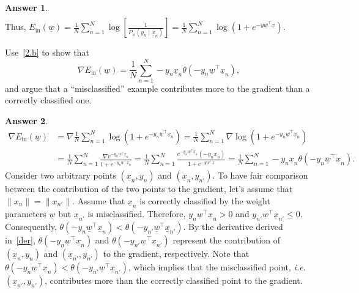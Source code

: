 \documentclass{article}
\theoremstyle{definition}
\newtheorem*{answer}{Answer}
\begin{document}
\begin{question}
\begin{question}
\begin{answer}
\begin{align*}
			\end{align*}
			Thus, $E_{\text{in}}(\underline{w}) = \frac{1}{N} \sum_{n=1}^N \log\left[\frac{1}{P_{\underline{w}}(y_n \mid \underline{x}_n)}\right] = \frac{1}{N} \sum_{n=1}^N \log (1 + e^{-y \underline{w}^\top \underline{x}})$.
		\end{answer}
		\item Use~\ref{2.b} to show that
		\begin{equation*}
			\nabla E_{\text{in}}(\underline{w}) = \frac{1}{N} \sum_{n=1}^N -y_n \underline{x}_n \theta(-y_n \underline{w}^\top \underline{x}_n),
		\end{equation*}
		and argue that a ``misclassified'' example contributes more to the gradient than a correctly classified one.
		\begin{answer}
			\begin{align}
				\nabla E_{\text{in}}(\underline{w}) &= \nabla \frac{1}{N} \sum_{n=1}^N \log (1 + e^{-y_n \underline{w}^\top \underline{x}_n}) = \frac{1}{N} \sum_{n=1}^N \nabla \log (1 + e^{-y_n \underline{w}^\top \underline{x}_n})\nonumber \\ 
				&= \frac{1}{N} \sum_{n=1}^N \frac{\nabla e^{-y_n \underline{w}^\top \underline{x}_n}}{1 + e^{-y_n \underline{w}^\top \underline{x}_n}} = \frac{1}{N} \sum_{n=1}^N \frac{e^{-y_n \underline{w}^\top \underline{x}_n} (-y_n \underline{x}_n)}{1 + e^{-y \underline{w}^\top \underline{x}}} = \frac{1}{N} \sum_{n=1}^N -y_n \underline{x}_n \theta(-y_n \underline{w}^\top \underline{x}_n).\label{der}
			\end{align}
			Consider two arbitrary points $(\underline{x}_n, y_n)$ and $(\underline{x}_{n}, y_{n'})$. To have fair comparison between the contribution of the two points to the gradient, let's assume that $\|x_n\|=\|x_{n'}\|$. Assume that $\underline{x}_n$ is correctly classified by the weight parameters $\underline{w}$ but $\underline{x}_{n'}$ is misclassified. Therefore, $y_n \underline{w}^\top \underline{x}_n>0$ and $y_{n'} \underline{w}^\top \underline{x}_{n'} \leq 0$. Consequently, $\theta(-y_n \underline{w}^\top \underline{x}_n) < \theta(-y_{n'} \underline{w}^\top \underline{x}_{n'})$. By the derivative derived in~\eqref{der}, $\theta(-y_n \underline{w}^\top \underline{x}_n)$ and  $\theta(-y_{n'} \underline{w}^\top \underline{x}_{n'})$ represent the contribution of $(\underline{x}_n, y_n)$ and $(\underline{x}_{n'}, y_{n'})$ to the gradient, respectively. Note that $\theta(-y_n \underline{w}^\top \underline{x}_n) < \theta(-y_{n'} \underline{w}^\top \underline{x}_{n'})$, which implies that the misclassified point, \emph{i.e.} $(\underline{x}_{n'}, y_{n'})$, contributes more than the correctly classified point to the gradient.
		\end{answer}
	\end{question}
	

\end{question}
\end{document}
